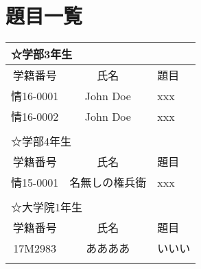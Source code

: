 \documentclass[11pt]{jarticle}
\begin{document}
\thispagestyle{empty}

\section*{題目一覧}

\begin{table}[htb]
\begin{tabular}{|c|c|p{31em}|}

\multicolumn{3}{l}{☆学部3年生} \\
\hline
学籍番号 & 氏名 & 題目 \\
\hline
情16-0001 & John Doe & xxx \\
\hline
情16-0002 & John Doe & xxx \\
\hline

\multicolumn{3}{l}{} \\


\multicolumn{3}{l}{☆学部4年生} \\
\hline
学籍番号 & 氏名 & 題目 \\
\hline
情15-0001 & 名無しの権兵衛 & xxx \\
\hline

\multicolumn{3}{l}{} \\

\multicolumn{3}{l}{☆大学院1年生} \\
\hline
学籍番号 & 氏名 & 題目 \\
\hline
17M2983 & ああああ & いいい \\
\hline

\multicolumn{3}{l}{} \\

\end{tabular}
\end{table}
\end{document}
